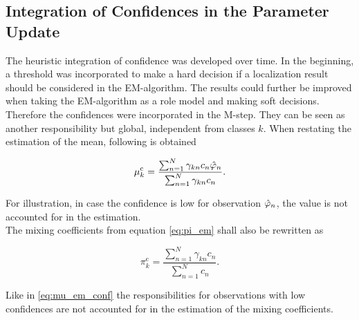 \subsection{Integration of Confidences in the Parameter Update}
The heuristic integration of confidence was developed over time. In the beginning, a threshold was incorporated to make a hard decision if a localization result should be considered in the \ac{EM}-algorithm. The results could further be improved when taking the \ac{EM}-algorithm as a role model and making soft decisions. Therefore the confidences were incorporated in the M-step. They can be seen as another responsibility but global, independent from classes $k$. When restating the estimation of the mean, following is obtained

\begin{equation}
\mu_k^\text{c} = \frac{\sum^N_{n=1}\gamma_{kn}c_n \hat{\varphi}_n}{\sum^N_{n=1}\gamma_{kn}c_n}.
\label{eq:mu_em_conf}
\end{equation}

For illustration, in case the confidence is low for observation $\hat{\varphi}_n$, the value is not accounted for in the estimation. \\
The mixing coefficients from equation \ref{eq:pi_em} shall also be rewritten as

\begin{equation}
\pi_k^\text{c} = \frac{\sum^N_{n=1}\gamma_{kn}c_n}{\sum_{n=1}^{N} c_n}
\label{eq:pi_conf}.
\end{equation}

Like in \ref{eq:mu_em_conf} the responsibilities for observations with low confidences are not accounted for in the estimation of the mixing coefficients.

